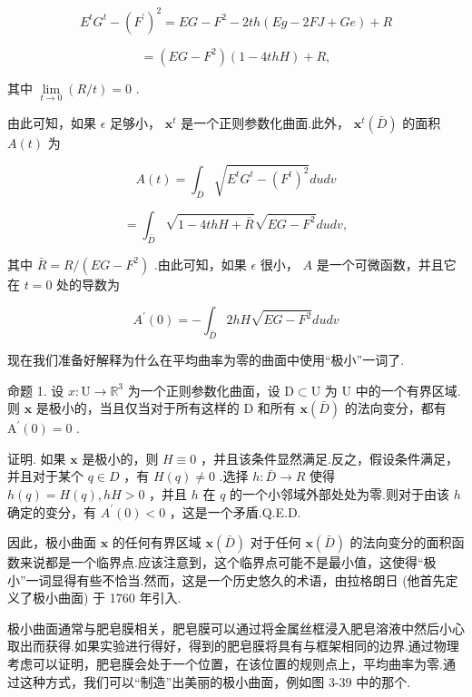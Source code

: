 \[
{E}^{t}{G}^{t} - {\left( {F}^{\prime }\right) }^{2} = {EG} - {F}^{2} - {2th}\left( {{Eg} - {2FJ} + {Ge}}\right)  + R
\]

\[
= \left( {{EG} - {F}^{2}}\right) \left( {1 - {4thH}}\right)  + R,
\]

其中 \(\mathop{\lim }\limits_{{t \rightarrow  0}}\left( {R/t}\right)  = 0\) .

由此可知，如果 \(\epsilon\) 足够小， \({\mathbf{x}}^{t}\) 是一个正则参数化曲面.此外， \({\mathbf{x}}^{t}\left( \bar{D}\right)\) 的面积 \(A\left( t\right)\) 为

\[
A\left( t\right)  = {\int }_{\bar{D}}\sqrt{{E}^{t}{G}^{t} - {\left( {F}^{t}\right) }^{2}}{dudv}
\]

\[
= {\int }_{\bar{D}}\sqrt{1 - {4thH} + \bar{R}}\sqrt{{EG} - {F}^{2}}{dudv},
\]

其中 \(\bar{R} = R/\left( {{EG} - {F}^{2}}\right)\) .由此可知，如果 \(\epsilon\) 很小， \(A\) 是一个可微函数，并且它在 \(t = 0\) 处的导数为

\[
{A}^{\prime }\left( 0\right)  =  - {\int }_{\bar{D}}{2hH}\sqrt{{EG} - {F}^{2}}{dudv} \tag{12}
\]

现在我们准备好解释为什么在平均曲率为零的曲面中使用“极小”一词了.

命题 1. 设 \(x : \mathrm{U} \rightarrow  {\mathbb{R}}^{3}\) 为一个正则参数化曲面，设 \(\mathrm{D} \subset  \mathrm{U}\) 为 \(\mathrm{U}\) 中的一个有界区域.则 \(\mathbf{x}\) 是极小的，当且仅当对于所有这样的 \(\mathrm{D}\) 和所有 \(\mathbf{x}\left( \bar{D}\right)\) 的法向变分，都有 \({\mathrm{A}}^{\prime }\left( 0\right)  = 0\) .

证明. 如果 \(\mathbf{x}\) 是极小的，则 \(H \equiv  0\) ，并且该条件显然满足.反之，假设条件满足，并且对于某个 \(q \in  D\) ，有 \(H\left( q\right)  \neq  0\) .选择 \(h : \bar{D} \rightarrow  R\) 使得 \(h\left( q\right)  = H\left( q\right) ,{hH} > 0\) ，并且 \(h\) 在 \(q\) 的一个小邻域外部处处为零.则对于由该 \(h\) 确定的变分，有 \({A}^{\prime }\left( 0\right)  < 0\) ，这是一个矛盾.Q.E.D.

因此，极小曲面 \(\mathbf{x}\) 的任何有界区域 \(\mathbf{x}\left( \bar{D}\right)\) 对于任何 \(\mathbf{x}\left( \bar{D}\right)\) 的法向变分的面积函数来说都是一个临界点.应该注意到，这个临界点可能不是最小值，这使得“极小”一词显得有些不恰当.然而，这是一个历史悠久的术语，由拉格朗日 (他首先定义了极小曲面) 于 1760 年引入.

极小曲面通常与肥皂膜相关，肥皂膜可以通过将金属丝框浸入肥皂溶液中然后小心取出而获得.如果实验进行得好，得到的肥皂膜将具有与框架相同的边界.通过物理考虑可以证明，肥皂膜会处于一个位置，在该位置的规则点上，平均曲率为零.通过这种方式，我们可以“制造”出美丽的极小曲面，例如图 3-39 中的那个.

